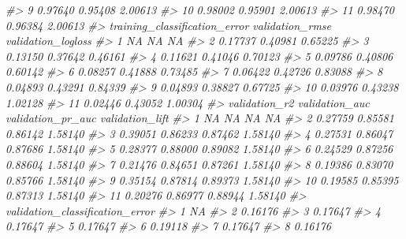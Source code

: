 \documentclass[]{book}
\newenvironment{Shaded}{\begin{snugshade}}{\end{snugshade}}
\newcommand{\CommentTok}[1]{\textcolor[rgb]{0.56,0.35,0.01}{\textit{#1}}}
\begin{document}
\begin{Shaded}
\begin{Highlighting}[]
{{{{{{\CommentTok{#> 9       0.97640         0.95408       2.00613}
\CommentTok{#> 10      0.98002         0.95901       2.00613}
\CommentTok{#> 11      0.98470         0.96384       2.00613}
\CommentTok{#>    training_classification_error validation_rmse validation_logloss}
\CommentTok{#> 1                             NA              NA                 NA}
\CommentTok{#> 2                        0.17737         0.40981            0.65225}
\CommentTok{#> 3                        0.13150         0.37642            0.46161}
\CommentTok{#> 4                        0.11621         0.41046            0.70123}
\CommentTok{#> 5                        0.09786         0.40806            0.60142}
\CommentTok{#> 6                        0.08257         0.41888            0.73485}
\CommentTok{#> 7                        0.06422         0.42726            0.83088}
\CommentTok{#> 8                        0.04893         0.43291            0.84339}
\CommentTok{#> 9                        0.04893         0.38827            0.67725}
\CommentTok{#> 10                       0.03976         0.43238            1.02128}
\CommentTok{#> 11                       0.02446         0.43052            1.00304}
\CommentTok{#>    validation_r2 validation_auc validation_pr_auc validation_lift}
\CommentTok{#> 1             NA             NA                NA              NA}
\CommentTok{#> 2        0.27759        0.85581           0.86142         1.58140}
\CommentTok{#> 3        0.39051        0.86233           0.87462         1.58140}
\CommentTok{#> 4        0.27531        0.86047           0.87686         1.58140}
\CommentTok{#> 5        0.28377        0.88000           0.89082         1.58140}
\CommentTok{#> 6        0.24529        0.87256           0.88604         1.58140}
\CommentTok{#> 7        0.21476        0.84651           0.87261         1.58140}
\CommentTok{#> 8        0.19386        0.83070           0.85766         1.58140}
\CommentTok{#> 9        0.35154        0.87814           0.89373         1.58140}
\CommentTok{#> 10       0.19585        0.85395           0.87313         1.58140}
\CommentTok{#> 11       0.20276        0.86977           0.88944         1.58140}
\CommentTok{#>    validation_classification_error}
\CommentTok{#> 1                               NA}
\CommentTok{#> 2                          0.16176}
\CommentTok{#> 3                          0.17647}
\CommentTok{#> 4                          0.17647}
\CommentTok{#> 5                          0.17647}
\CommentTok{#> 6                          0.19118}
\CommentTok{#> 7                          0.17647}
\CommentTok{#> 8                          0.16176}
}}}}}}
\end{Highlighting}
\end{Shaded}
\end{document}
